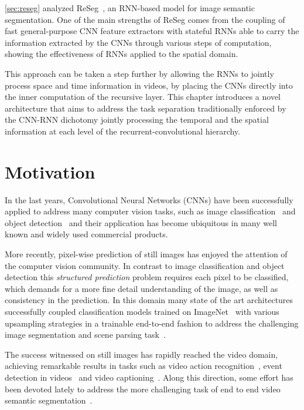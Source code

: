\autoref{sec:reseg} analyzed ReSeg~\citep{Visin_2016_CVPR_Workshops}, an
RNN-based model for image semantic segmentation. One of the main strengths of
ReSeg comes from the coupling of fast general-purpose CNN feature extractors
with stateful RNNs able to carry the information extracted by the CNNs through
various steps of computation, showing the effectiveness of RNNs applied to the
spatial domain.

This approach can be taken a step further by allowing the RNNs to jointly
process space and time information in videos, by placing the CNNs directly into
the inner computation of the recursive layer. This chapter introduces a novel
architecture that aims to address the task separation traditionally enforced by
the CNN-RNN dichotomy jointly processing the temporal and the spatial
information at each level of the recurrent-convolutional hierarchy.


\section{Motivation}

In the last years, Convolutional Neural Networks (CNNs) have been successfully
applied to address many computer vision tasks, such as image
classification~\citep{Krizhevsky2012-alexnet,Simonyan2015,
Szegedy-et-al-arxiv2014} and object detection~\citep{Girshick-et-al-arxiv2013,
Sermanet13overfeat} and their application has become ubiquitous in many well
known and widely used commercial products.

More recently, pixel-wise prediction of still images has enjoyed the attention
of the computer vision community. In contrast to image classification and
object detection this \emph{structured prediction} problem requires each
pixel to be classified, which demands for a more fine detail understanding of
the image, as well as consistency in the prediction. In this domain many
state of the art architectures successfully coupled classification models
trained on ImageNet~\citep{Simonyan14vgg,Szegedy15googlelenet} with various
upsampling strategies in a trainable end-to-end fashion to address the
challenging image segmentation and scene parsing task~\citep[see e.g.,~][]{
long2014fully,noh2015learning}.

The success witnessed on still images has rapidly reached the video domain,
achieving remarkable results in tasks such as video action recognition~\citep{
simonyan2014two,karpathy2014large}, event detection in videos~\citep{
yeung2015end} and video captioning~\citep{yao2015describing}. Along this
direction, some effort has been devoted lately to address the more
challenging task of end to end video semantic segmentation~\citep{Tran16v2v}.

